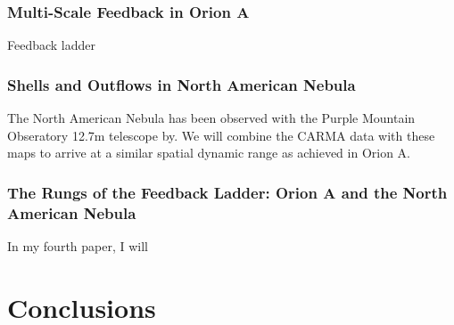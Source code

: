         \subsubsection{Multi-Scale Feedback in Orion A}\label{sec:paper2}
        Feedback ladder
        \subsubsection{Shells and Outflows in North American Nebula}\label{sec:paper3}
        The North American Nebula has been observed with the Purple Mountain Obseratory 12.7m telescope by. We will combine the CARMA data with these maps to arrive at a similar spatial dynamic range as achieved in Orion A.
        \subsubsection{The Rungs of the Feedback Ladder: Orion A and the North American Nebula}\label{sec:paper4}
        In my fourth paper, I will 
\section{Conclusions}\label{sec:conclusions}
    